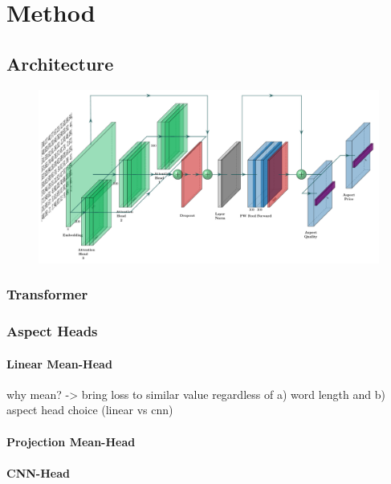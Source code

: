 \chapter{Method}
\label{ch:method}

\section{Architecture}

\begin{figure}[htp]
	\centering
	\includegraphics[width=\textwidth]{figures/04_method/04_t-absa}
	\caption{}
	\label{fig:04_t-absa}
\end{figure}

\subsection{Transformer}

\subsection{Aspect Heads}

\subsubsection{Linear Mean-Head}

why mean? -> bring loss to similar value regardless of a) word length and b) aspect head choice (linear vs cnn)

\subsubsection{Projection Mean-Head}

\subsubsection{CNN-Head}

